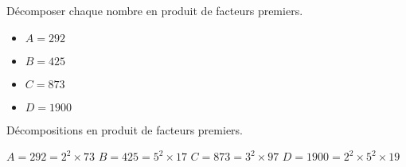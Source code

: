 \begin{exercice*}
    \label{N2exosBase014}
    Décomposer chaque nombre en produit de facteurs premiers.
    \begin{itemize}
        \item[] $A=292$
        \item[] $B=425$
        \item[] $C=873$
        \item[] $D=\num{1900}$
    \end{itemize}
\end{exercice*}
\begin{corrige}
    Décompositions en produit de facteurs premiers.
    
    \begin{itemize}
        \def\item{}
        \item $A=292=2^2\times 73$
        \item $B=425=5^2\times 17$
        \item $C=873=3^2\times 97$
        \item $D=\num{1900}=2^2\times 5^2 \times 19$
    \end{itemize}

\end{corrige}

